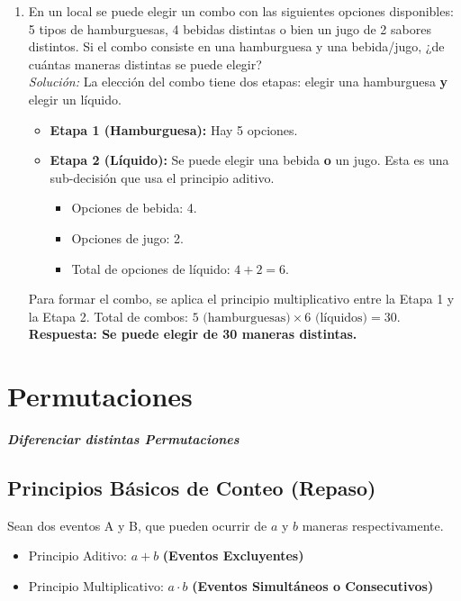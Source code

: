 \documentclass[12pt, letterpaper]{article}
\begin{document}
\begin{enumerate}
	\item En un local se puede elegir un combo con las siguientes opciones disponibles: 5 tipos de hamburguesas, 4 bebidas distintas o bien un jugo de 2 sabores distintos. Si el combo consiste en una hamburguesa y una bebida/jugo, ¿de cuántas maneras distintas se puede elegir? \\
	      \textit{Solución:}
	      La elección del combo tiene dos etapas: elegir una hamburguesa \textbf{y} elegir un líquido.
	      \begin{itemize}
		      \item \textbf{Etapa 1 (Hamburguesa):} Hay 5 opciones.
		      \item \textbf{Etapa 2 (Líquido):} Se puede elegir una bebida \textbf{o} un jugo. Esta es una sub-decisión que usa el principio aditivo.
		            \begin{itemize}
			            \item Opciones de bebida: 4.
			            \item Opciones de jugo: 2.
			            \item Total de opciones de líquido: $4 + 2 = 6$.
		            \end{itemize}
	      \end{itemize}
	      Para formar el combo, se aplica el principio multiplicativo entre la Etapa 1 y la Etapa 2.
	      Total de combos: $5 \text{ (hamburguesas)} \times 6 \text{ (líquidos)} = 30$. \\
	      \textbf{Respuesta: Se puede elegir de 30 maneras distintas.}
\end{enumerate}
\newpage


\section{Permutaciones}
\textbf{\textit{\large{Diferenciar distintas Permutaciones}}}
\subsection{Principios Básicos de Conteo (Repaso)}
Sean dos eventos A y B, que pueden ocurrir de $a$ y $b$ maneras respectivamente.
\begin{itemize}
	\item Principio Aditivo: $a + b$ \textbf{ (Eventos Excluyentes)}
	\item Principio Multiplicativo: $a \cdot b$ \textbf{ (Eventos Simultáneos o Consecutivos)}
\end{itemize}
\end{document}

